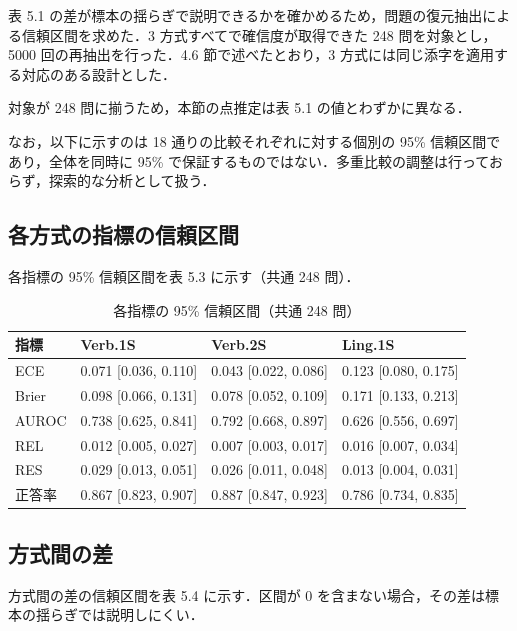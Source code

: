 表 5.1 の差が標本の揺らぎで説明できるかを確かめるため，問題の復元抽出による信頼区間を求めた．3 方式すべてで確信度が取得できた 248 問を対象とし，5000 回の再抽出を行った．4.6 節で述べたとおり，3 方式には同じ添字を適用する対応のある設計とした．

対象が 248 問に揃うため，本節の点推定は表 5.1 の値とわずかに異なる．

なお，以下に示すのは 18 通りの比較それぞれに対する個別の 95\% 信頼区間であり，全体を同時に 95\% で保証するものではない．多重比較の調整は行っておらず，探索的な分析として扱う．

\subsection{各方式の指標の信頼区間}

各指標の 95\% 信頼区間を表 5.3 に示す（共通 248 問）．

\begin{table}[htbp]
\centering
\small
\caption{各指標の 95\% 信頼区間（共通 248 問）}
\label{tab:5.3}
\begin{tabular}{|l|l|l|l|}
\hline
指標 & Verb.1S & Verb.2S & Ling.1S \\
\hline
ECE & 0.071 [0.036, 0.110] & 0.043 [0.022, 0.086] & 0.123 [0.080, 0.175] \\
Brier & 0.098 [0.066, 0.131] & 0.078 [0.052, 0.109] & 0.171 [0.133, 0.213] \\
AUROC & 0.738 [0.625, 0.841] & 0.792 [0.668, 0.897] & 0.626 [0.556, 0.697] \\
REL & 0.012 [0.005, 0.027] & 0.007 [0.003, 0.017] & 0.016 [0.007, 0.034] \\
RES & 0.029 [0.013, 0.051] & 0.026 [0.011, 0.048] & 0.013 [0.004, 0.031] \\
正答率 & 0.867 [0.823, 0.907] & 0.887 [0.847, 0.923] & 0.786 [0.734, 0.835] \\
\hline
\end{tabular}
\end{table}

\subsection{方式間の差}

方式間の差の信頼区間を表 5.4 に示す．区間が 0 を含まない場合，その差は標本の揺らぎでは説明しにくい．

